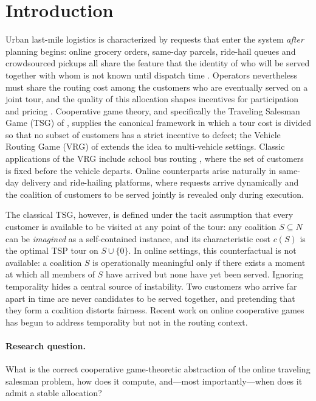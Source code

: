 \documentclass[11pt]{article}
\theoremstyle{plain}
\theoremstyle{definition}
\theoremstyle{remark}
\begin{document}
\section{Introduction}
\label{sec:introduction}

Urban last-mile logistics is characterized by requests that enter the system \emph{after} planning begins: online grocery orders, same-day parcels, ride-hail queues and crowdsourced pickups all share the feature that the identity of who will be served together with whom is not known until dispatch time \citep{pillac2013review,ausiello2001oltsp}. Operators nevertheless must share the routing cost among the customers who are eventually served on a joint tour, and the quality of this allocation shapes incentives for participation and pricing \citep{guajardo2016review}. Cooperative game theory, and specifically the Traveling Salesman Game (TSG) of \citet{potters1992tsg}, supplies the canonical framework in which a tour cost is divided so that no subset of customers has a strict incentive to defect; the Vehicle Routing Game (VRG) of \citet{gothe1996vrg,engevall2004heterogeneous} extends the idea to multi-vehicle settings. Classic applications of the VRG include school bus routing \citep{park2012schoolbus}, where the set of customers is fixed before the vehicle departs. Online counterparts arise naturally in same-day delivery and ride-hailing platforms, where requests arrive dynamically and the coalition of customers to be served jointly is revealed only during execution.

The classical TSG, however, is defined under the tacit assumption that every customer is available to be visited at any point of the tour: any coalition $S\subseteq N$ can be \emph{imagined} as a self-contained instance, and its characteristic cost $c(S)$ is the optimal TSP tour on $S\cup\{0\}$. In online settings, this counterfactual is not available: a coalition $S$ is operationally meaningful only if there exists a moment at which all members of $S$ have arrived but none have yet been served. Ignoring temporality hides a central source of instability. Two customers who arrive far apart in time are never candidates to be served together, and pretending that they form a coalition distorts fairness. Recent work on online cooperative games \citep{ge2024incentives,aziz2025participation,goyal2025temporal} has begun to address temporality but not in the routing context.

\paragraph{Research question.} What is the correct cooperative game-theoretic abstraction of the online traveling salesman problem, how does it compute, and---most importantly---when does it admit a stable allocation?
\end{document}
